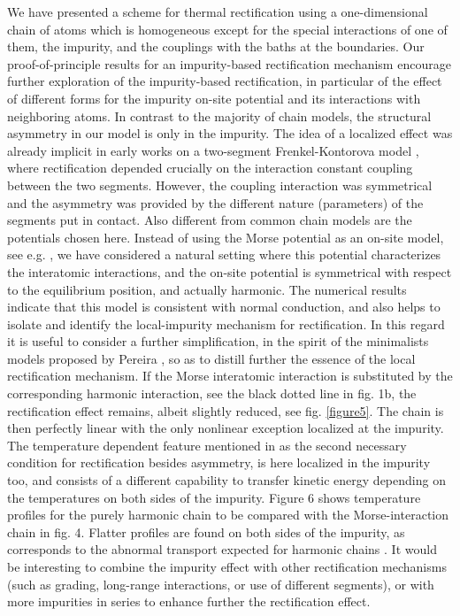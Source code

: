 We have presented  a scheme for thermal rectification using a one-dimensional chain of atoms which is homogeneous except
for the special interactions of one of them, the impurity, and the couplings with the baths at the boundaries.
Our  proof-of-principle results for an impurity-based rectification mechanism encourage further exploration of the
impurity-based rectification, in particular
of the effect of different forms for the impurity on-site potential and its interactions with neighboring atoms.
In contrast to the majority of chain models, the structural asymmetry in our model
is only in the impurity. The idea of a localized effect was already implicit in early works on a two-segment Frenkel-Kontorova
model \cite{Li2004,Hu2006}, where rectification depended crucially on the interaction constant coupling between the two segments.
However, the coupling interaction was symmetrical and the asymmetry was provided by the different nature
(parameters) of the segments put in contact.
Also different from common chain models are the potentials chosen here. Instead of using the Morse
potential as an on-site model, see e.g.  \cite{Terraneo2002},
we have considered a natural setting where this potential characterizes the interatomic interactions,
and the on-site potential is symmetrical with respect to the equilibrium position, and actually harmonic.
The numerical results indicate that this model is consistent with normal conduction,
and also helps to isolate and identify the local-impurity mechanism for rectification.
In this regard it is useful to consider a further simplification, in the spirit of the minimalists models
proposed by Pereira \cite{Pereira2017}, so as to distill further the essence of the local rectification mechanism.
If the Morse interatomic interaction is substituted by the corresponding harmonic interaction, see the black dotted line in fig. 1b, the rectification effect remains, albeit slightly reduced, see fig. \ref{figure5}. The chain is then perfectly linear with the only nonlinear exception  localized
at the impurity.
The temperature dependent feature mentioned in \cite{Pereira2017} as the second necessary condition for rectification besides asymmetry, is here localized in the impurity too, and consists of a different
capability to transfer kinetic energy depending on the temperatures on both sides of the impurity.
Figure 6 shows temperature profiles for the purely harmonic chain to be compared with the Morse-interaction
chain in fig. 4. Flatter profiles are found on both sides of the impurity,
as corresponds to the abnormal transport expected for harmonic chains \cite{Lepri2003}.
It would be interesting to combine the impurity effect with other rectification mechanisms (such as grading, long-range interactions, or use of different segments), or with more impurities in series to enhance further the rectification effect.


